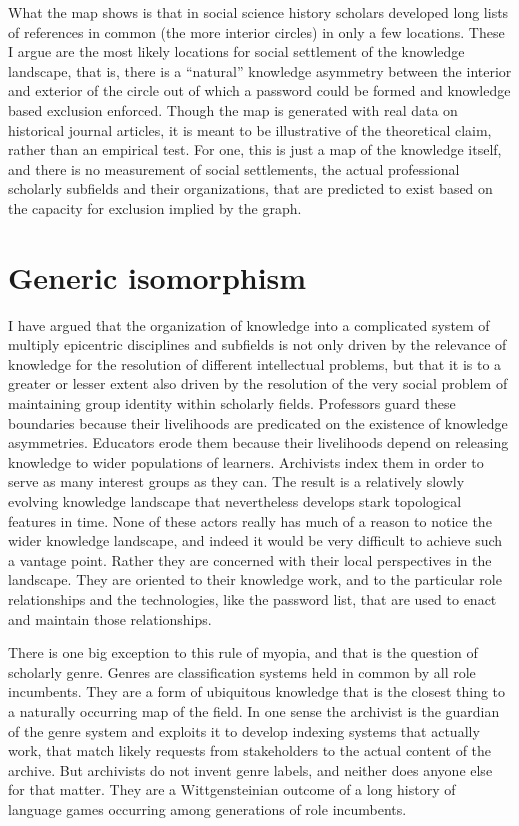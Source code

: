 \documentclass[]{book}
\theoremstyle{definition}
\theoremstyle{definition}
\theoremstyle{definition}
\theoremstyle{remark}
\begin{document}
What the map shows is that in social science history scholars developed
long lists of references in common (the more interior circles) in only a
few locations. These I argue are the most likely locations for social
settlement of the knowledge landscape, that is, there is a ``natural''
knowledge asymmetry between the interior and exterior of the circle out
of which a password could be formed and knowledge based exclusion
enforced. Though the map is generated with real data on historical
journal articles, it is meant to be illustrative of the theoretical
claim, rather than an empirical test. For one, this is just a map of the
knowledge itself, and there is no measurement of social settlements, the
actual professional scholarly subfields and their organizations, that
are predicted to exist based on the capacity for exclusion implied by
the graph.

\hypertarget{generic-isomorphism}{%
\section{Generic isomorphism}\label{generic-isomorphism}}

I have argued that the organization of knowledge into a complicated
system of multiply epicentric disciplines and subfields is not only
driven by the relevance of knowledge for the resolution of different
intellectual problems, but that it is to a greater or lesser extent also
driven by the resolution of the very social problem of maintaining group
identity within scholarly fields. Professors guard these boundaries
because their livelihoods are predicated on the existence of knowledge
asymmetries. Educators erode them because their livelihoods depend on
releasing knowledge to wider populations of learners. Archivists index
them in order to serve as many interest groups as they can. The result
is a relatively slowly evolving knowledge landscape that nevertheless
develops stark topological features in time. None of these actors really
has much of a reason to notice the wider knowledge landscape, and indeed
it would be very difficult to achieve such a vantage point. Rather they
are concerned with their local perspectives in the landscape. They are
oriented to their knowledge work, and to the particular role
relationships and the technologies, like the password list, that are
used to enact and maintain those relationships.

There is one big exception to this rule of myopia, and that is the
question of scholarly genre. Genres are classification systems held in
common by all role incumbents. They are a form of ubiquitous knowledge
that is the closest thing to a naturally occurring map of the field. In
one sense the archivist is the guardian of the genre system and exploits
it to develop indexing systems that actually work, that match likely
requests from stakeholders to the actual content of the archive. But
archivists do not invent genre labels, and neither does anyone else for
that matter. They are a Wittgensteinian outcome of a long history of
language games occurring among generations of role incumbents.
\end{document}
